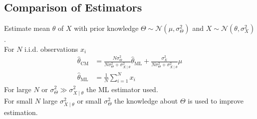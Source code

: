 \begin{mdframed}[style=eqbox]
  \subsection{Comparison of Estimators}
  Estimate mean $\theta$ of $X$ with prior knowledge $\Theta \sim \mathcal{N}(\mu, \sigma_\Theta^2)$ and $X \sim \mathcal{N}(\theta, \sigma_X^2)$.\\[0.25em]
  For $N$ i.i.d. observations $x_i$
  \vspace*{-4pt}
  \begin{align*}
    \hat{\theta}_\text{CM} &= \frac{N \sigma_\Theta^2}{N \sigma_\Theta^2 + \sigma_{X\mid\theta}^2} \hat{\theta}_{\text{ML}} + \frac{\sigma_X^2}{N \sigma_\Theta^2 + \sigma_{X\mid\theta}^2} \mu\\
    \hat{\theta}_\text{ML} &= \frac{1}{N} \sum_{i=1}^N x_i
  \end{align*}
  For large $N$ or $\sigma_\Theta^2 \gg \sigma_{X\mid\theta}^2$ the ML estimator used.\\
  For small $N$ large $\sigma_{X\mid\theta}^2$ or small $\sigma_\Theta^2$ the knowledge about $\Theta$ is used to improve estimation.
\end{mdframed}